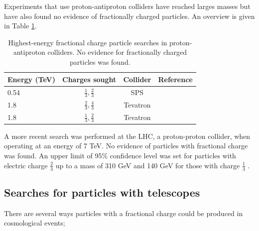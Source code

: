 Experiments that use proton-antiproton colliders have reached larges masses but have also found no evidence of fractionally charged particles. An overview is given in Table \ref{tab:protonantiprotoncollider}.


\begin{table}[]
\caption{Highest-energy fractional charge particle searches in proton-antiproton colliders. No evidence for fractionally charged particles was found.}
\label{tab:protonantiprotoncollider}
\centering
\begin{tabular}{|l|c|c|c|}
\hline
\rowcolor[HTML]{9B9B9B} 
Energy (TeV) & Charges sought            & Collider & Reference \\ \hline
0.54		 & $\frac{1}{3},\frac{2}{3}$ & SPS      & \cite{Banner:1985ev} \\ \hline
1.8          & $\frac{2}{3},\frac{4}{3}$ & Tevatron & \cite{Abe:1992vr}         \\ \hline
1.8          & $\frac{1}{3},\frac{2}{3}$ & Tevatron & \cite{Acosta:2002ju} \\ \hline
\end{tabular}
\end{table}

A more recent search was performed at the LHC, a proton-proton collider, when operating at an energy of 7 TeV. No evidence of particles with fractional charge was found. An upper limit of 95\% confidence level was set for particles with electric charge $\frac{2}{3}$ up to a mass of 310 GeV and 140 GeV for those with charge $\frac{1}{3}$ \cite{CMS:2012xi}.

\subsection{Searches for particles with telescopes}
There are several ways particles with a fractional charge could be produced in cosmological events;

